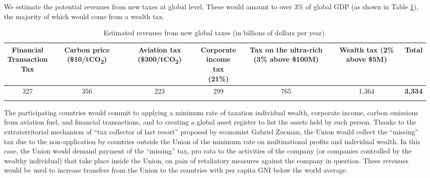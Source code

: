 \documentclass[12pt,english]{article}
\newcommand{\bo}[1]{\textbf{#1}}
\begin{document}
We estimate the potential revenues from new taxes at global level.\cite{fabre_shared_2024} These would amount to over 3\% of global GDP (as shown in Table \ref{tab:su}), the majority of which would come from a wealth tax. %


\begin{table}[h!]
  \centering 
  \caption{Estimated revenues from new global taxes (in billions of dollars per year).\label{tab:su}}
  \begin{tabular}[t]{ccccccc}
  \toprule
  \makecell{Financial\\Transaction\\Tax} & \makecell{Carbon\\price\\(\$10/tCO\textsubscript{2})} & \makecell{Aviation\\tax\\(\$300/tCO\textsubscript{2})} & \makecell{Corporate\\income tax\\(21\%)} & \makecell{Tax on the\\ultra-rich\\(3\% above\\ \$100M)} & \makecell{Wealth tax\\(2\% above\\ \$5M)} & \bo{Total} \\
  \midrule
  327 & 356 & 223 & 299 & 765 & 1,364 & \bo{3,334} \\
  \bottomrule\\[-0.81em]
  \end{tabular}
\end{table}

The participating countries would commit to applying a minimum rate of taxation individual wealth, corporate income, carbon emissions from aviation fuel, and financial transactions, and to creating a global asset register to list the assets held by each person. 
Thanks to the extraterritorial mechanism of ``tax collector of last resort'' proposed by economist Gabriel Zucman,\cite{zucman_blueprint_2024} the Union would collect the ``missing'' tax due to the non-application by countries outside the Union of the minimum rate on multinational profits and individual wealth. In this case, the Union would demand payment of the ``missing'' tax, pro rata to the activities of the company (or companies controlled by the wealthy individual) that take place inside the Union, on pain of retaliatory measures against the company in question. These revenues would be used to increase transfers from the Union to the countries with per capita GNI below the world average. 
\end{document}
